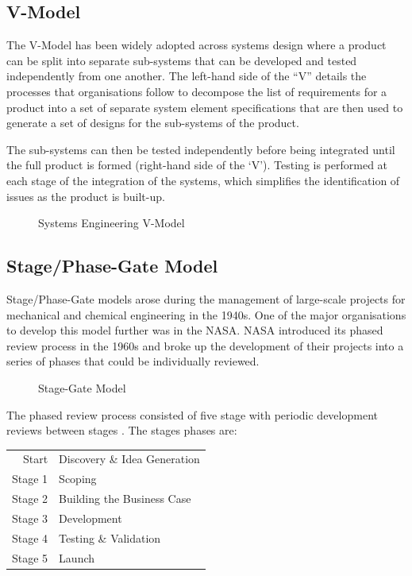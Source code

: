 \subsection{V-Model}

The V-Model  has been widely adopted across systems design where a product can be split into separate sub-systems that can be developed and tested independently from one another.
The left-hand side of the ``V'' details the processes that organisations follow to decompose the list of requirements for a product into a set of separate system element specifications that are then used to generate a set of designs for the sub-systems of the product.

The sub-systems can then be tested independently before being integrated until the full product is formed (right-hand side of the `V'). 
Testing is performed at each stage of the integration of the systems, which simplifies the identification of issues as the product is built-up.

\begin{figure}[h!]
    \centering
    
    \caption{Systems Engineering V-Model}\label{fig-v-model}
\end{figure}


\subsection{Stage/Phase-Gate Model}

Stage/Phase-Gate models arose during the management of large-scale projects for mechanical and chemical engineering in the 1940s. One of the major organisations to develop this model further was in the \acf{NASA}.
\ac{NASA} introduced its phased review process in the 1960s and broke up the development of their projects into a series of phases that could be individually reviewed.

\begin{figure}
    \centering
    
    \caption{Stage-Gate Model}\label{fig-stage}
\end{figure}

The phased review process consisted of five stage with periodic development reviews between stages . 
The stages phases are:

\begin{table}
    \begin{tabular}{r l}
        Start & Discovery \& Idea Generation \\
        Stage 1 & Scoping \\
        Stage 2 & Building the Business Case \\
        Stage 3 & Development \\
        Stage 4 & Testing \& Validation \\
        Stage 5 & Launch \\
    \end{tabular}
\end{table}


